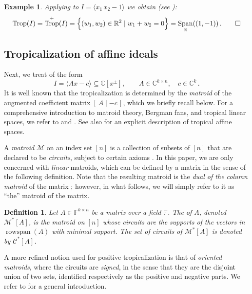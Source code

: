 \documentclass[11pt,reqno,a4paper]{amsart}
\numberwithin{equation}{section}
\theoremstyle{theoremstyle}
\theoremstyle{examplestyle}
\newtheorem{example}[theorem]{Example}
\newtheorem{definition}[theorem]{Definition}
\newcommand{\CC}{\mathbb{C}}
\newcommand{\RR}{\mathbb{R}}
\DeclareMathOperator{\rowspan}{rowspan}
\DeclareMathOperator{\Span}{Span}
\DeclareMathOperator{\Trop}{Trop}
\newcommand{\term}{\bfemph}
\begin{document}
 
\begin{example}
  \label{ex:polyhedralStructureBinomial}
   Applying  to $I=\langle x_1\, x_2 -1\rangle$ we obtain (see ):
  \begin{equation*}
   \Trop(I)=  \Trop^+(I) =\Big\{ (w_1,w_2)\in\RR^2\mid w_1 + w_2 = 0\Big\} = \Span_{\RR}( (1,-1))\,. \qedhere
  \end{equation*}
\end{example}



\subsection{Tropicalization of affine ideals}
\label{subsec:tropicalizing_affine_ideals}
Next, we treat \term{affine ideals} of the form
\[ I=\langle Ax-c\rangle\subseteq \CC[x^\pm], \qquad A\in \CC^{k \times n}, \quad c\in \CC^k \, . \]
It is well known that the tropicalization is determined by the \emph{matroid} of the augmented coefficient matrix $[\,A\mid-c\,]$, which we briefly recall below. 
For a comprehensive introduction to matroid theory, Bergman fans, and tropical linear spaces, we refer to \cite[Section~4.2]{MaclaganSturmfels15} and  \cite{Oxley}. See also \cite[Section~3]{BonifaceDevriendtHosten2025} for an explicit description of tropical affine spaces. 

A \emph{matroid} $\mathcal{M}$ on an index set $[n]$ is a collection of subsets of $[n]$ that are declared to be \emph{circuits}, subject to certain axioms \cite[Section~1.1]{Oxley}.
In this paper, we are only concerned with \emph{linear} matroids, which can be defined by a matrix in the sense of the following definition. Note that the resulting matroid is the \emph{dual of the column matroid} of the matrix \cite[Section~2.1]{Oxley}; however, in what follows, we will simply refer to it as ``the'' matroid of the matrix. 
 
\begin{definition}
  \label{def:matroid}
  Let $A\in \mathbb{F}^{k\times n}$ be a matrix over a field $\mathbb{F}$. The \term{matroid} of $A$, denoted $\mathcal{M}^*[A]$, is the matroid on $[n]$ whose circuits are the supports of the vectors in $\rowspan(A)$ with minimal support.
  The set of circuits of $\mathcal{M}^*[A]$ is denoted by $\mathcal{C}^*[A]$.
\end{definition}

A more refined notion used for positive tropicalization is that of \emph{oriented matroids}, where the circuits are \emph{signed}, in the sense that  they are the disjoint union of two sets, identified respectively as the positive and negative parts. We refer to   \cite{BjornerLasVergnasSturmfelsWhiteZiegler:1999} for a general introduction.
\end{document}
